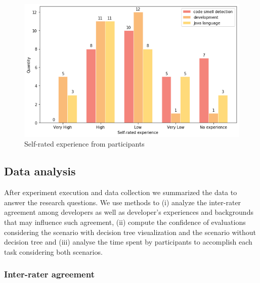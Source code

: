 \begin{figure}[t]
\centering
\includegraphics[scale=0.65]{figures/Self-rated_experience.png}
\caption{Self-rated experience from participants}
\label{fig:sefRatedExperience}
\end{figure}

\subsection{Data analysis}

After experiment execution and data collection we summarized the data to answer the research questions. We use methods to (i) analyze the inter-rater agreement among developers as well as developer's experiences and backgrounds that may influence such agreement, (ii) compute the confidence of evaluations considering the scenario with decision tree visualization and the scenario without decision tree and (iii) analyse the time spent by participants to accomplish each task considering both scenarios.

\subsubsection{Inter-rater agreement}

